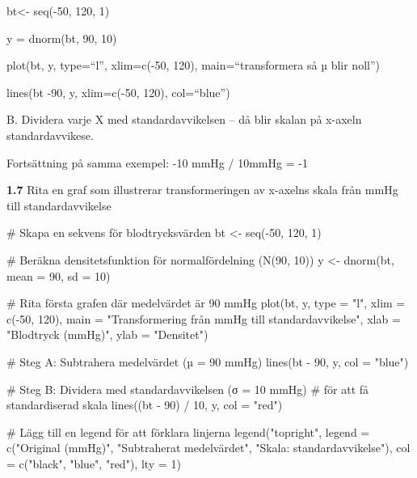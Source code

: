 \documentclass[
  letterpaper,
  DIV=11,
  numbers=noendperiod]{scrartcl}
\newenvironment{Shaded}{\begin{snugshade}}{\end{snugshade}}
\newcommand{\AttributeTok}[1]{\textcolor[rgb]{0.40,0.45,0.13}{#1}}
\newcommand{\CommentTok}[1]{\textcolor[rgb]{0.37,0.37,0.37}{#1}}
\newcommand{\DecValTok}[1]{\textcolor[rgb]{0.68,0.00,0.00}{#1}}
\newcommand{\FunctionTok}[1]{\textcolor[rgb]{0.28,0.35,0.67}{#1}}
\newcommand{\NormalTok}[1]{\textcolor[rgb]{0.00,0.23,0.31}{#1}}
\newcommand{\OtherTok}[1]{\textcolor[rgb]{0.00,0.23,0.31}{#1}}
\newcommand{\SpecialCharTok}[1]{\textcolor[rgb]{0.37,0.37,0.37}{#1}}
\newcommand{\StringTok}[1]{\textcolor[rgb]{0.13,0.47,0.30}{#1}}
\begin{document}
bt\textless- seq(-50, 120, 1)

y = dnorm(bt, 90, 10)

plot(bt, y, type=``l'', xlim=c(-50, 120), main=``transformera så µ blir
noll'')

lines(bt -90, y, xlim=c(-50, 120), col=``blue'')

B. Dividera varje X med standardavvikelsen -- då blir skalan på x-axeln
standardavvikese.

Fortsättning på samma exempel: -10 mmHg / 10mmHg = -1

\textbf{1.7} Rita en graf som illustrerar transformeringen av x-axelns
skala från mmHg till standardavvikelse

\begin{Shaded}
\begin{Highlighting}[]
\CommentTok{\# Skapa en sekvens för blodtrycksvärden}
\NormalTok{bt }\OtherTok{\textless{}{-}} \FunctionTok{seq}\NormalTok{(}\SpecialCharTok{{-}}\DecValTok{50}\NormalTok{, }\DecValTok{120}\NormalTok{, }\DecValTok{1}\NormalTok{)}

\CommentTok{\# Beräkna densitetsfunktion för normalfördelning (N(90, 10))}
\NormalTok{y }\OtherTok{\textless{}{-}} \FunctionTok{dnorm}\NormalTok{(bt, }\AttributeTok{mean =} \DecValTok{90}\NormalTok{, }\AttributeTok{sd =} \DecValTok{10}\NormalTok{)}

\CommentTok{\# Rita första grafen där medelvärdet är 90 mmHg}
\FunctionTok{plot}\NormalTok{(bt, y, }\AttributeTok{type =} \StringTok{"l"}\NormalTok{, }\AttributeTok{xlim =} \FunctionTok{c}\NormalTok{(}\SpecialCharTok{{-}}\DecValTok{50}\NormalTok{, }\DecValTok{120}\NormalTok{),}
\AttributeTok{main =} \StringTok{"Transformering från mmHg till standardavvikelse"}\NormalTok{,}
     \AttributeTok{xlab =} \StringTok{"Blodtryck (mmHg)"}\NormalTok{, }\AttributeTok{ylab =} \StringTok{"Densitet"}\NormalTok{)}

\CommentTok{\# Steg A: Subtrahera medelvärdet (µ = 90 mmHg)}
\FunctionTok{lines}\NormalTok{(bt }\SpecialCharTok{{-}} \DecValTok{90}\NormalTok{, y, }\AttributeTok{col =} \StringTok{"blue"}\NormalTok{)}

\CommentTok{\# Steg B: Dividera med standardavvikelsen (σ = 10 mmHg)}
\CommentTok{\# för att få standardiserad skala}
\FunctionTok{lines}\NormalTok{((bt }\SpecialCharTok{{-}} \DecValTok{90}\NormalTok{) }\SpecialCharTok{/} \DecValTok{10}\NormalTok{, y, }\AttributeTok{col =} \StringTok{"red"}\NormalTok{)}

\CommentTok{\# Lägg till en legend för att förklara linjerna}
\FunctionTok{legend}\NormalTok{(}\StringTok{"topright"}\NormalTok{, }\AttributeTok{legend =} \FunctionTok{c}\NormalTok{(}\StringTok{"Original (mmHg)"}\NormalTok{,}
\StringTok{"Subtraherat medelvärdet"}\NormalTok{,}
\StringTok{"Skala: standardavvikelse"}\NormalTok{),}
       \AttributeTok{col =} \FunctionTok{c}\NormalTok{(}\StringTok{"black"}\NormalTok{, }\StringTok{"blue"}\NormalTok{, }\StringTok{"red"}\NormalTok{), }\AttributeTok{lty =} \DecValTok{1}\NormalTok{)}
\end{Highlighting}
\end{Shaded}
\end{document}
